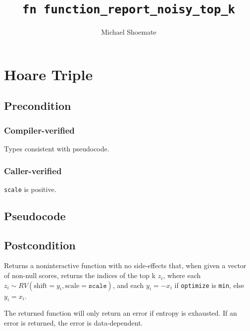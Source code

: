 \documentclass{article}
\title{\texttt{fn function\_report\_noisy\_top\_k}}
\author{Michael Shoemate}
\begin{document}
  
\maketitle 
 
\section{Hoare Triple} 
\subsection*{Precondition} 
\subsubsection*{Compiler-verified}
Types consistent with pseudocode.

\subsubsection*{Caller-verified}
\texttt{scale} is positive.
 
\subsection*{Pseudocode} 
\label{sec:python-pseudocode} 
 
 
\subsection*{Postcondition} 

\begin{theorem}
    Returns a noninteractive function with no side-effects that, 
    when given a vector of non-null scores,
    returns the indices of the top k $z_i$,
    where each $z_i \sim RV(\mathrm{shift}=y_i, \mathrm{scale}=\texttt{scale})$,
    and each $y_i = -x_i$ if \texttt{optimize} is \texttt{min}, else $y_i = x_i$.

    The returned function will only return an error if entropy is exhausted.
    If an error is returned, the error is data-dependent.
\end{theorem}
\end{document}
